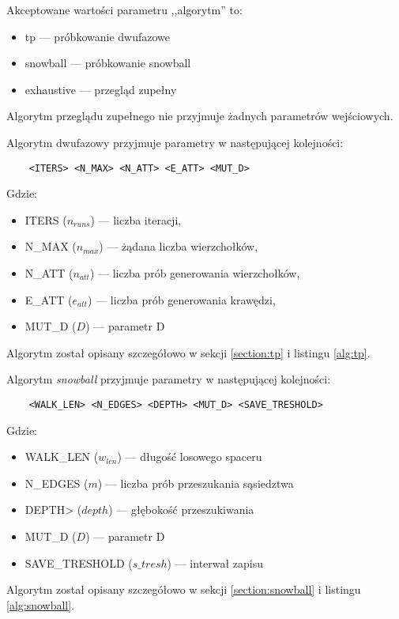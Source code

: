 Akceptowane wartości parametru ,,algorytm'' to:
\begin{itemize}
    \item tp --- próbkowanie dwufazowe
    \item snowball --- próbkowanie snowball
    \item exhaustive --- przegląd zupełny
\end{itemize}

Algorytm przeglądu zupełnego nie przyjmuje żadnych parametrów wejściowych.

Algorytm dwufazowy przyjmuje parametry w następującej kolejności:

\begin{lstlisting}
    <ITERS> <N_MAX> <N_ATT> <E_ATT> <MUT_D>
\end{lstlisting}
Gdzie:
\begin{itemize}
    \item ITERS ($n_{runs}$) --- liczba iteracji,
    \item N\_MAX ($n_{max}$) --- żądana liczba wierzchołków,
    \item N\_ATT ($n_{att}$) --- liczba prób generowania wierzchołków,
    \item E\_ATT ($e_{att}$) --- liczba prób generowania krawędzi,
    \item MUT\_D ($D$) --- parametr D
\end{itemize}

Algorytm został opisany szczegółowo w sekcji \ref{section:tp} i listingu \ref{alg:tp}.

Algorytm \textit{snowball} przyjmuje parametry w następującej kolejności:

\begin{lstlisting}
    <WALK_LEN> <N_EDGES> <DEPTH> <MUT_D> <SAVE_TRESHOLD>
\end{lstlisting}
Gdzie:
\begin{itemize}
    \item WALK\_LEN ($w_{len}$) --- długość losowego spaceru
    \item N\_EDGES ($m$) --- liczba prób przeszukania sąsiedztwa
    \item DEPTH> ($depth$) --- głębokość przeszukiwania
    \item MUT\_D ($D$) --- parametr D
    \item SAVE\_TRESHOLD ($s\_tresh$) --- interwał zapisu
\end{itemize}

Algorytm został opisany szczegółowo w sekcji \ref{section:snowball} i listingu \ref{alg:snowball}.

